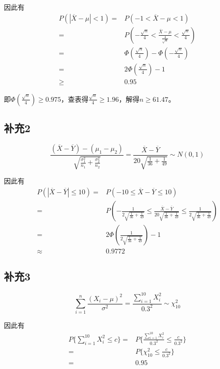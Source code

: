\documentclass[a4paper,12pt]{ctexart}
\begin{document}
因此有
\begin{align*}
	P(|\overline{X} - \mu| < 1) =& P(-1 < \overline{X} - \mu < 1) \\
	=& P(-\frac{\sqrt{n}}{4} < \frac{\overline{X} - \mu}{\frac{4}{\sqrt{n}}} < \frac{\sqrt{n}}{4}) \\
	=& \Phi(\frac{\sqrt{n}}{4}) - \Phi(-\frac{\sqrt{n}}{4}) \\
	=& 2\Phi(\frac{\sqrt{n}}{4}) - 1 \\
	\geq& 0.95
\end{align*}

即$\Phi(\frac{\sqrt{n}}{4}) \geq 0.975$，查表得$\frac{\sqrt{n}}{4} \geq 1.96$，解得$n \geq 61.47$。

\subsection*{补充2}

\begin{equation*}
	\frac{(\overline{X} - \overline{Y}) - (\mu_1 - \mu_2)}{\sqrt{\frac{\sigma_1^2}{n_1}+\frac{\sigma_2^2}{n_2}}} = \frac{\overline{X} - \overline{Y}}{20 \sqrt{\frac{1}{36}+\frac{1}{49}}} \sim N(0, 1)
\end{equation*}

因此有
\begin{align*}
	P(|\overline{X} - \overline{Y}| \leq 10) =& P(-10 \leq \overline{X} - \overline{Y} \leq 10) \\
	=& P(-\frac{1}{2\sqrt{\frac{1}{36}+\frac{1}{49}}} \leq \frac{\overline{X} - \overline{Y}}{20 \sqrt{\frac{1}{36}+\frac{1}{49}}} \leq \frac{1}{2\sqrt{\frac{1}{36}+\frac{1}{49}}}) \\
	=& 2\Phi(\frac{1}{2\sqrt{\frac{1}{36}+\frac{1}{49}}}) - 1 \\
	\approx& 0.9772
\end{align*}

\subsection*{补充3}

\begin{equation*}
	\sum_{i=1}^n \frac{(X_i - \mu)^2}{\sigma^2} = \frac{\sum_{i=1}^{10} X_i^2}{0.3^2} \sim \chi^2_{10}
\end{equation*}

因此有
\begin{align*}
	P\{\sum_{i=1}^{10} X_i^2 \leq c\} =& P\{\frac{\sum_{i=1}^{10} X_i^2}{0.3^2} \leq \frac{c}{0.3^2}\} \\
	=& P\{\chi^2_{10} \leq \frac{c}{0.3^2}\} \\
	=& 0.95
\end{align*}
\end{document}
